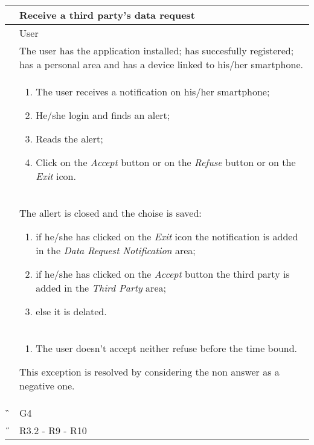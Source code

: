 \begin{center}
	\begin{longtable}{ | p{} | p{} | }
		\hline
		 \A &   Receive a third party's data request\\ 

		\hline
		 \B &  User \\ 

		\hline
  		 \C &  The user has the application installed; has succesfully registered; has a personal area and has a device linked to his/her smartphone.\\ 

		\hline
		\D & \begin{enumerate}
			\item The user receives a notification on his/her smartphone;
			\item He/she login and finds an alert;
			\item Reads the alert;
			\item Click on the \textit{Accept} button or on the \textit{Refuse} button or on the \textit{Exit} icon.
		\end{enumerate} \\

		\hline
		\E & The allert is closed and the choise is saved: \begin{enumerate}
			\item if he/she has clicked on the \textit{Exit} icon the notification is added in the \textit{Data Request Notification} 				area;
			\item if he/she has clicked on the \textit{Accept} button the third party is added in the \textit{Third Party} area;					\item else it is delated.
		\end{enumerate}\\

		\hline
		\F & \begin{enumerate}
			\item The user doesn't accept neither refuse before the time bound.
		\end{enumerate} This exception is resolved by considering the non answer as a negative one. \\
		
		\hline
		\G & G4\\

		\hline
		\H & R3.2 - R9 - R10 \\
		\hline

	\end{longtable}
\end{center}